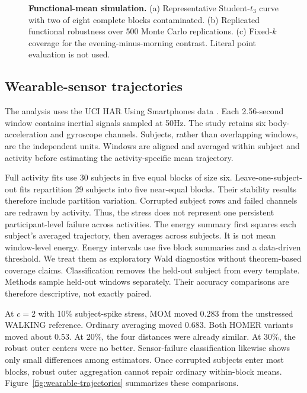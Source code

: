 \documentclass[twoside]{article}
\theoremstyle{definition}
\begin{document}
\begin{figure}[t]
\centering
\resizebox{\textwidth}{!}{}
\caption{\textbf{Functional-mean simulation.}
(a) Representative Student-$t_3$ curve with two of eight complete blocks contaminated. (b) Replicated functional robustness over 500 Monte Carlo replications. (c) Fixed-$k$ coverage for the evening-minus-morning contrast. Literal point evaluation is not used.}
\label{fig:functional-mean-curves}
\end{figure}

\subsection{Wearable-sensor trajectories}

The analysis uses the UCI HAR Using Smartphones data \citep{jorgereyes-ortiz_2013_HumanActivityRecognition}. Each 2.56-second window contains inertial signals sampled at 50Hz. The study retains six body-acceleration and gyroscope channels. Subjects, rather than overlapping windows, are the independent units. Windows are aligned and averaged within subject and activity before estimating the activity-specific mean trajectory.

Full activity fits use 30 subjects in five equal blocks of size six. Leave-one-subject-out fits repartition 29 subjects into five near-equal blocks. Their stability results therefore include partition variation. Corrupted subject rows and failed channels are redrawn by activity. Thus, the stress does not represent one persistent participant-level failure across activities. The energy summary first squares each subject's averaged trajectory, then averages across subjects. It is not mean window-level energy. Energy intervals use five block summaries and a data-driven threshold. We treat them as exploratory Wald diagnostics without theorem-based coverage claims. Classification removes the held-out subject from every template. Methods sample held-out windows separately. Their accuracy comparisons are therefore descriptive, not exactly paired.

At $c=2$ with 10\% subject-spike stress, MOM moved $0.283$ from the unstressed WALKING reference. Ordinary averaging moved $0.683$. Both HOMER variants moved about $0.53$. At 20\%, the four distances were already similar. At 30\%, the robust outer centers were no better. Sensor-failure classification likewise shows only small differences among estimators. Once corrupted subjects enter most blocks, robust outer aggregation cannot repair ordinary within-block means. Figure~\ref{fig:wearable-trajectories} summarizes these comparisons.
\end{document}
